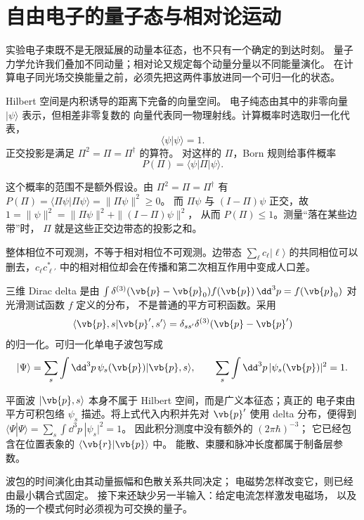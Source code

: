 \chapter{自由电子的量子态与相对论运动}
\label{chap:feqo-electron-state}

实验电子束既不是无限延展的动量本征态，也不只有一个确定的到达时刻。
量子力学允许我们叠加不同动量；相对论又规定每个动量分量以不同能量演化。
在计算电子同光场交换能量之前，必须先把这两件事放进同一个可归一化的状态。



\begin{definition}[纯态、射线与归一化]
Hilbert 空间是内积诱导的距离下完备的向量空间。
电子纯态由其中的非零向量 \(|\psi\rangle\) 表示，但相差非零复数的
向量代表同一物理射线。计算概率时选取归一化代表，
\[
\langle\psi|\psi\rangle=1.
\]
正交投影是满足 \(\Pi^2=\Pi=\Pi^\dagger\) 的算符。
对这样的 \(\Pi\)，Born 规则给事件概率
\[
P(\Pi)=\langle\psi|\Pi|\psi\rangle.
\]
\end{definition}

这个概率的范围不是额外假设。由 \(\Pi^2=\Pi=\Pi^\dagger\)
有 \(P(\Pi)=\langle\Pi\psi|\Pi\psi\rangle=\|\Pi\psi\|^2\ge0\)。
而 \(\Pi\psi\) 与 \((I-\Pi)\psi\) 正交，故
\(1=\|\psi\|^2=\|\Pi\psi\|^2+\|(I-\Pi)\psi\|^2\)，
从而 \(P(\Pi)\le1\)。测量“落在某些边带”时，
\(\Pi\) 就是这些正交边带态的投影之和。

整体相位不可观测，不等于相对相位不可观测。边带态
\(\sum_\ell c_\ell|\ell\rangle\) 的共同相位可以删去，\(c_\ell c_{\ell'}^*\)
中的相对相位却会在传播和第二次相互作用中变成人口差。

\begin{definition}[连续动量基与波包]
三维 Dirac delta 是由
\(\int\delta^{(3)}(\vb{p}-\vb{p}_0)f(\vb{p})\,\dd^3p
=f(\vb{p}_0)\) 对光滑测试函数 \(f\) 定义的分布，
不是普通的平方可积函数。采用
\[
\langle\vb{p},s|\vb{p}',s'\rangle
=\delta_{ss'}\delta^{(3)}(\vb{p}-\vb{p}')
\]
的归一化。可归一化单电子波包写成
\[
|\Psi\rangle=\sum_s\int\dd^3p\,
\psi_s(\vb{p})|\vb{p},s\rangle,
\qquad
\sum_s\int\dd^3p\,|\psi_s(\vb{p})|^2=1.
\]
\end{definition}

平面波 \(|\vb{p},s\rangle\) 本身不属于 Hilbert 空间，而是广义本征态；真正的
电子束由平方可积包络 \(\psi_s\) 描述。将上式代入内积并先对
\(\vb{p}'\) 使用 delta 分布，便得到
\(\langle\Psi|\Psi\rangle=\sum_s\int\dd^3p\,|\psi_s|^2=1\)。
因此积分测度中没有额外的 \((2\pi\hbar)^{-3}\)；
它已经包含在位置表象的 \(\langle\vb{r}|\vb{p}\rangle\) 中。
能散、束腰和脉冲长度都属于制备层参数。



波包的时间演化由其动量振幅和色散关系共同决定；
电磁势怎样改变它，则已经由最小耦合式固定。
接下来还缺少另一半输入：给定电流怎样激发电磁场，
以及场的一个模式何时必须视为可交换的量子。
